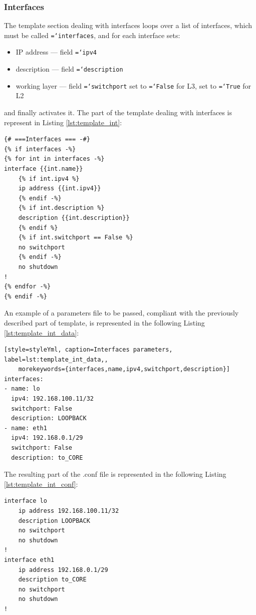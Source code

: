\documentclass{report}
\newcommand{\monospaced}[1]{\texttt{\hyphenchar\font=`\-#1}}
\begin{document}
\subsubsection{Interfaces}\label{sec:template_frr_int}
The template section dealing with interfaces loops over a list of interfaces, which must be called \monospaced{interfaces}, and for each interface sets:
\begin{itemize}
    \item IP address --- field \monospaced{ipv4}
    \item description --- field \monospaced{description}
    \item working layer --- field \monospaced{switchport} set to \monospaced{False} for L3, set to \monospaced{True} for L2
\end{itemize}
and finally activates it. The part of the template dealing with interfaces is represent in Listing \ref{lst:template_int}:
\begin{lstlisting}[style=styleJinja, caption=FRR template - interfaces, label=lst:template_int]      
{# ===Interfaces === -#}
{% if interfaces -%}
{% for int in interfaces -%}
interface {{int.name}}
    {% if int.ipv4 %}
    ip address {{int.ipv4}}
    {% endif -%}
    {% if int.description %}
    description {{int.description}}
    {% endif %}
    {% if int.switchport == False %}
    no switchport
    {% endif -%}
    no shutdown
!
{% endfor -%}
{% endif -%}
\end{lstlisting}
An example of a parameters file to be passed, compliant with the previously described part of template, is represented in the following Listing \ref{lst:template_int_data}:
\begin{lstlisting}[style=styleYml, caption=Interfaces parameters, label=lst:template_int_data,,
    morekeywords={interfaces,name,ipv4,switchport,description}]      
interfaces:
- name: lo
  ipv4: 192.168.100.11/32
  switchport: False
  description: LOOPBACK
- name: eth1
  ipv4: 192.168.0.1/29
  switchport: False
  description: to_CORE
\end{lstlisting}
The resulting part of the .conf file is represented in the following Listing \ref{lst:template_int_conf}:
\begin{lstlisting}[style=styleConf, caption=Configuration example, label=lst:template_int_conf]      
interface lo
    ip address 192.168.100.11/32
    description LOOPBACK
    no switchport
    no shutdown
!
interface eth1
    ip address 192.168.0.1/29
    description to_CORE
    no switchport
    no shutdown
!
\end{lstlisting}
\end{document}
